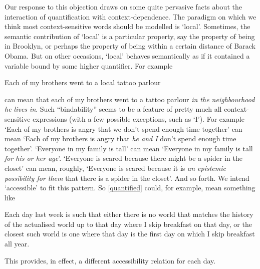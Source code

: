 \documentclass[If.tex]{subfiles}
\begin{document}
\begin{prop}
Our response to this objection draws on some quite pervasive facts about the interaction of quantification with context-dependence. The paradigm on which we think most context-sensitive words should be modelled is ‘local’. Sometimes, the semantic contribution of ‘local’ is a particular property, say the property of being in Brooklyn, or perhaps the property of being within a certain distance of Barack Obama. But on other occasions, ‘local’ behaves semantically as if it contained a variable bound by some higher quantifier. For example
\begin{prop}
	\nitem 
		Each of my brothers went to a local tattoo parlour
\end{prop}
can mean that each of my brothers went to a tattoo parlour \emph{in the neighbourhood he lives in}. Such “bindability” seems to be a feature of pretty much all context-sensitive expressions (with a few possible exceptions, such as ‘I’). For example ‘Each of my brothers is angry that we don't spend enough time together’ can mean ‘Each of my brothers is angry that \emph{he and I} don't spend enough time together’. ‘Everyone in my family is tall’ can mean ‘Everyone in my family is tall \emph{for his or her age}’. ‘Everyone is scared because there might be a spider in the closet’ can mean, roughly, ‘Everyone is scared because it is \emph{an epistemic possibility for them} that there is a spider in the closet’. And so forth. We intend ‘accessible’ to fit this pattern. So \ref{quantified} could, for example, mean something like
\begin{prop}
	\nitem 
		Each day last week is such that either there is no world that matches the history of the actualised world up to that day where I skip breakfast on that day, or the closest such world is one where that day is the first day on which I skip breakfast all year.
\end{prop}
This provides, in effect, a different accessibility relation for each day.


\end{prop}
\end{document}
